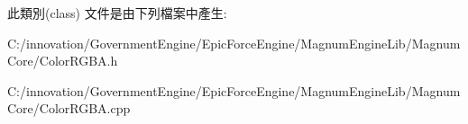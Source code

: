 此類別(class) 文件是由下列檔案中產生\+:\begin{DoxyCompactItemize}
\item 
C\+:/innovation/\+Government\+Engine/\+Epic\+Force\+Engine/\+Magnum\+Engine\+Lib/\+Magnum\+Core/Color\+R\+G\+B\+A.\+h\item 
C\+:/innovation/\+Government\+Engine/\+Epic\+Force\+Engine/\+Magnum\+Engine\+Lib/\+Magnum\+Core/Color\+R\+G\+B\+A.\+cpp\end{DoxyCompactItemize}
